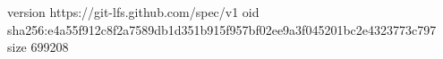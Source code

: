 version https://git-lfs.github.com/spec/v1
oid sha256:e4a55f912c8f2a7589db1d351b915f957bf02ee9a3f045201bc2e4323773c797
size 699208
